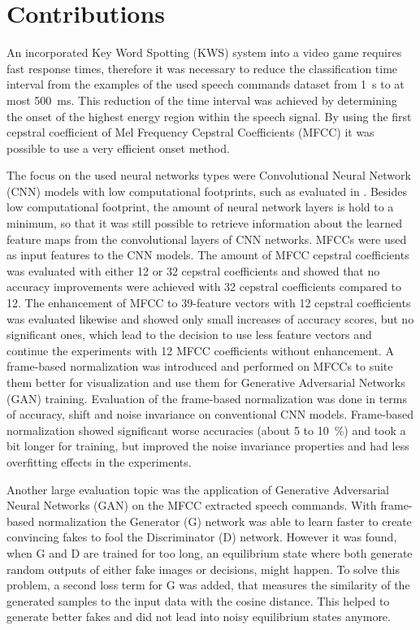 
\section{Contributions}
\thesisStateReady
\thesisStateNew
An incorporated Key Word Spotting (KWS) system into a video game requires fast response times, therefore it was necessary to reduce the classification time interval from the examples of the used speech commands dataset \cite{Warden2018} from \SI{1}{\second} to at most \SI{500}{\milli\second}.
This reduction of the time interval was achieved by determining the onset of the highest energy region within the speech signal.
By using the first cepstral coefficient of Mel Frequency Cepstral Coefficients (MFCC) it was possible to use a very efficient onset method.

The focus on the used neural networks types were Convolutional Neural Network (CNN) models with low computational footprints, such as evaluated in \cite{Sainath2015}.
Besides low computational footprint, the amount of neural network layers is hold to a minimum, so that it was still possible to retrieve information about the learned feature maps from the convolutional layers of CNN networks.
MFCCs were used as input features to the CNN models.
The amount of MFCC cepstral coefficients was evaluated with either 12 or 32 cepstral coefficients and showed that no accuracy improvements were achieved with 32 cepstral coefficients compared to 12.
The enhancement of MFCC to 39-feature vectors with 12 cepstral coefficients was evaluated likewise and showed only small increases of accuracy scores, but no significant ones, which lead to the decision to use less feature vectors and continue the experiments with 12 MFCC coefficients without enhancement.
A frame-based normalization was introduced and performed on MFCCs to suite them better for visualization and use them for Generative Adversarial Networks (GAN) training.
Evaluation of the frame-based normalization was done in terms of accuracy, shift and noise invariance on conventional CNN models.
Frame-based normalization showed significant worse accuracies (about 5 to \SI{10}{\percent}) and took a bit longer for training, but improved the noise invariance properties and had less overfitting effects in the experiments.

Another large evaluation topic was the application of Generative Adversarial Neural Networks (GAN) on the MFCC extracted speech commands. 
With frame-based normalization the Generator (G) network was able to learn faster to create convincing fakes to fool the Discriminator (D) network.
However it was found, when G and D are trained for too long, an equilibrium state where both generate random outputs of either fake images or decisions, might happen.
To solve this problem, a second loss term for G was added, that measures the similarity of the generated samples to the input data with the cosine distance.
This helped to generate better fakes and did not lead into noisy equilibrium states anymore.


